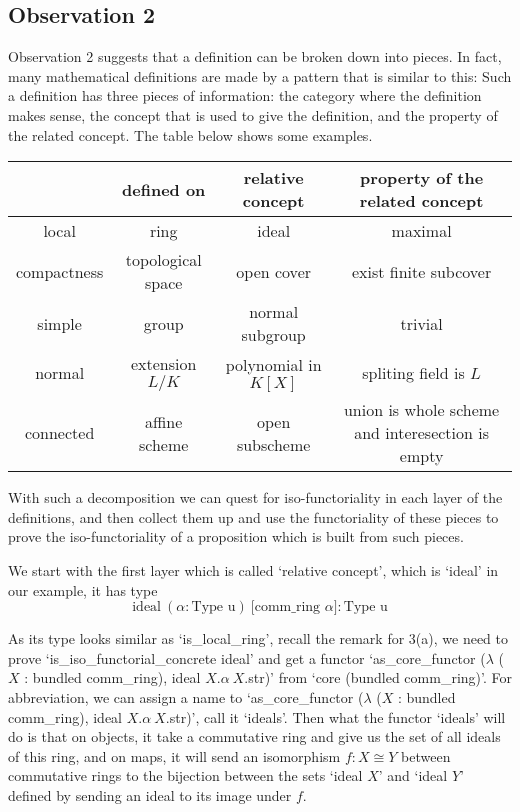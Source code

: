 \documentclass[11pt]{article}
\begin{document}
\subsection{Observation 2}

Observation 2 suggests that a definition can be broken down into pieces. In fact, many mathematical definitions are made by a pattern that is similar to this: Such a definition has three pieces of information: the category where the definition makes sense, the concept that is used to give the definition, and the property of the related concept. The table below shows some examples.

\begin{center}
    \begin{tabular}{||c c c c||} 
    \hline
     & defined on & relative concept & property of the related concept \\
    \hline\hline
    local & ring & ideal & maximal \\ 
    \hline
    compactness & topological space & open cover & exist finite subcover\\
    \hline
    simple & group & normal subgroup & trivial \\
    \hline
    normal & extension $L/K$ & polynomial in $K[X]$ & spliting field is $L$\\
    \hline
    connected & affine scheme & open subscheme & union is whole scheme and interesection is empty\\
    \hline
   \end{tabular}
   \end{center}

With such a decomposition we can quest for iso-functoriality in each layer of the definitions, and then collect them up and use the functoriality of these pieces to prove the iso-functoriality of a proposition which is built from such pieces.

We start with the first layer which is called `relative concept', which is `ideal' in our example, it has type \[\text{ideal} \ (\alpha : \text{Type u}) \  \text{[comm\_ring $\alpha$]}: \text{Type u}\]

As its type looks similar as `is\_local\_ring', recall the remark for 3(a), we need to prove `is\_iso\_functorial\_concrete ideal' and get a functor `as\_core\_functor ($\lambda$ ($X$ : bundled comm\_ring), ideal $X.\alpha \ X$.str)' from `core (bundled comm\_ring)'. For abbreviation, we can assign a name to `as\_core\_functor ($\lambda$ ($X$ : bundled comm\_ring), ideal $X.\alpha \ X$.str)', call it `ideals'. Then what the functor `ideals' will do is that on objects, it take a commutative ring and give us the set of all ideals of this ring, and on maps, it will send an isomorphism $f: X\cong Y$ between commutative rings to the bijection between the sets `ideal $X$' and `ideal $Y$' defined by sending an ideal to its image under $f$.
\end{document}
